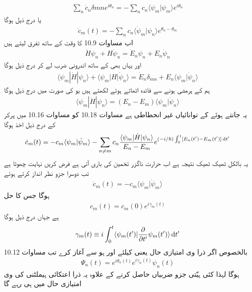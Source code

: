 \begin{align*}
\sum_n \dot{c}_n \delta mn e^{i \theta_n} = - \sum_n c_n \langle \psi_m | \psi_m \rangle e^{i \theta_n}
\end{align*}
یا درج ذیل ہوگا 
\begin{align}
\dot{c}_m (t) = - \sum_n c_n \langle \dot{\psi}_m | \psi_n \rangle e^{\theta_n - \theta_m}
\end{align}
اب مساوات 10.9 کا وقت کے ساتھ تفرق لیتے ہیں 
\begin{align*}
\dot{H} \psi_n + H \dot{\psi}_n = \dot{E}_n \psi_n + E_n \dot{\psi}_n
\end{align*}
اور یہاں بھی  کے ساتھ اندرونی ضرب لے کر درج ذیل ہوگا 
\begin{align}
\langle \psi_m | \dot{H} | \psi_n \rangle + \langle \psi_m | H | \dot{\psi}_n \rangle = \dot{E}_n \delta_{mn} + E_n \langle \psi_m | \dot{\psi}_n \rangle
\end{align} 
ہم  کے ہرمشی ہونے سے فائدہ اٹھاتے ہوئے  لکھتے ہیں یو  کی صورت میں درج ذیل ہوگا 
\begin{align}
\langle \psi_m | \dot{H} | \psi_n \rangle = (E_n - E_m) \langle \psi_m | \dot{\psi}_n \rangle
\end{align}
یہ جانتے ہوئے کے توانائیاں غیر انحطاطی ہے مساوات 10.18   کو مساوات 10.16 میں پرکر کے درج ذیل اخذ ہوگا 
\begin{align}
\dot{c}_m (t) = - c_m \langle \psi_m | \dot{\psi}_m \rangle - \sum_{n \ne m} c_n \frac{\langle \psi_m | \dot{H} | \psi_n \rangle}{E_n - E_m} e ^{(- i / \hslash) \int_0^1 [E_n(t') - E_m(t')] \dif t' }
\end{align}
یہ  بالکل ٹھیک ٹھیک نتیجہ ہے اب حرارت ناگزر تخمین کی باری آتی ہے فرض کریں  نہایت چھوٹا ہے تب دوسرا جزو نظر انداز کرتے ہوئے 
\begin{align}
\dot{c}_m (t) = - c_m \langle \psi_m | \dot{\psi}_m \rangle
\end{align} 
ہوگا جس کا حل 
\begin{align}
c_m (t) = c_m (0) e^{i \gamma_m (t)}
\end{align}
ہے جہاں درج ذیل ہوگا 
\begin{align}
\gamma_m (t) \equiv  i \int_0^t \langle \psi_m (t') | \frac{\partial}{\partial t'} \psi_m (t') \rangle \dif t'
\end{align}
بالخصوص اگر ذرا  وی امتیازی حال یعنی  کیلئے  اور  ہو سے آغاز کرے تب مساوات 10.12 
\begin{align}
\Psi_n (t) = e^{i \theta_n (t)} e^{i \gamma_n (t)} \psi_n (t)
\end{align}
ہوگا لہذا کئی ہیّتی جزو ضربیاں  حاصل کرنے کے علاوہ یہ ذرا اعتکائی ہيملٹنی کی  وی امتیازی حال میں ہی رہے گا 

